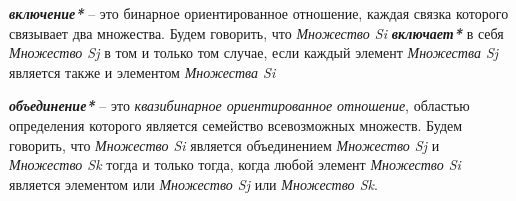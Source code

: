 
\textbf{\textit{включение*}} – это бинарное ориентированное отношение, каждая связка которого связывает два множества. Будем говорить, что \textit{Множество Si} \textbf{\textit{включает*}} в себя \textit{Множество Sj} в том и только том случае, если каждый элемент \textit{Множества Sj} является также и элементом \textit{Множества Si}



	
\textbf{\textit{объединение*}} – это \textit{квазибинарное ориентированное отношение}, областью определения которого является семейство всевозможных множеств. Будем говорить, что \textit{Множество Si} является объединением \textit{Множество Sj} и \textit{Множество Sk} тогда и только тогда, когда любой элемент \textit{Множество Si} является элементом или \textit{Множество Sj} или \textit{Множество Sk}.



